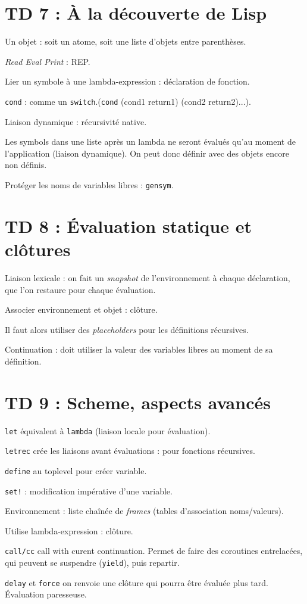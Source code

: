\documentclass[french]{article}
\def\code#1{\texttt{#1}}
\begin{document}
\section*{TD 7 : À la découverte de Lisp}
Un objet : soit un atome, soit une liste d'objets entre parenthèses.

\textit{Read Eval Print} : REP.

Lier un symbole à une lambda-expression : déclaration de fonction.

\code{cond} : comme un \code{switch}.(\code{cond} (cond1 return1) (cond2 return2)...).

Liaison dynamique : récursivité native.


Les symbols dans une liste après un lambda ne seront évalués qu'au moment de l'application (liaison dynamique). On peut donc définir avec des objets encore non définis.

Protéger les noms de variables libres : \code{gensym}.

\section*{TD 8 : Évaluation statique et clôtures}
Liaison lexicale : on fait un \textit{snapshot} de l'environnement à chaque déclaration, que l'on restaure pour chaque évaluation.

Associer environnement et objet : clôture.

Il faut alors utiliser des \textit{placeholders} pour les définitions récursives.

Continuation : doit utiliser la valeur des variables libres au moment de sa définition.

\section*{TD 9 : Scheme, aspects avancés}
\code{let} équivalent à \code{lambda} (liaison locale pour évaluation).

\code{letrec} crée les liaisons avant évaluations : pour fonctions récursives.

\code{define} au toplevel pour créer variable.

\code{set!} : modification impérative d'une variable.

Environnement : liste chaînée de \textit{frames} (tables d'association noms/valeurs).

Utilise lambda-expression : clôture.

\code{call/cc} call with curent continuation. Permet de faire des coroutines entrelacées, qui peuvent se suspendre (\code{yield}), puis repartir.

\code{delay} et \code{force} on renvoie une clôture qui pourra être évaluée plus tard. Évaluation paresseuse.
\end{document}
